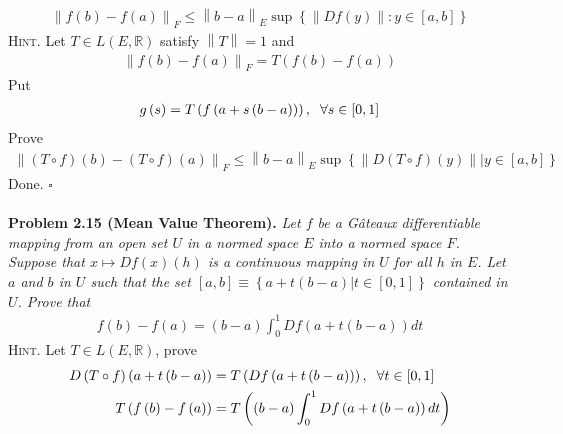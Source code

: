 \documentclass[a4paper]{article}
\numberwithin{equation}{section}
\begin{document}
\begin{align}
{\left\| {f\left( b \right) - f\left( a \right)} \right\|_F} \le {\left\| {b - a} \right\|_E}\sup \left\{ {\left\| {Df\left( y \right)} \right\|:y \in \left[ {a,b} \right]} \right\}
\end{align} 
\textsc{Hint.} Let $T \in L\left( {E,\mathbb{R}} \right)$ satisfy $\left\| T \right\| = 1$ and
\begin{align}
{\left\| {f\left( b \right) - f\left( a \right)} \right\|_F} = T\left( {f\left( b \right) - f\left( a \right)} \right)
\end{align}
Put 
\begin{align}
g\left( s \right) = T\left( {f\left( {a + s\left( {b - a} \right)} \right)} \right),\hspace{0.2cm}\forall s \in \left[ {0,1} \right]
\end{align}
Prove
\begin{align}
{\left\| {\left( {T \circ f} \right)\left( b \right) - \left( {T \circ f} \right)\left( a \right)} \right\|_F} \le {\left\| {b - a} \right\|_E}\sup \left\{ {\left\| {D\left( {T \circ f} \right)\left( y \right)} \right\||y \in \left[ {a,b} \right]} \right\}
\end{align}
Done. \hfill $\square$\\
\\
\textbf{Problem 2.15 (Mean Value Theorem).} \textit{Let $f$ be a G\^{a}teaux differentiable mapping from an open set $U$ in a normed space $E$ into a normed space $F$. Suppose that $x \mapsto Df\left( x \right)\left( h \right)$ is a continuous mapping in $U$ for all $h$ in $E$. Let $a$ and $b$ in $U$ such that the set $\left[ {a,b} \right] \equiv \left\{ {a + t\left( {b - a} \right)|t \in \left[ {0,1} \right]} \right\}$ contained in $U$. Prove that}
\begin{align}
f\left( b \right) - f\left( a \right) = \left( {b - a} \right)\int_0^1 {Df\left( {a + t\left( {b - a} \right)} \right)dt} 
\end{align}
\textsc{Hint.} Let $T \in L\left( {E,\mathbb{R}} \right)$, prove 
\begin{align}
D\left( {T \circ f} \right)\left( {a + t\left( {b - a} \right)} \right) &= T\left( {Df\left( {a + t\left( {b - a} \right)} \right)} \right),\hspace{0.2cm}\forall t \in \left[ {0,1} \right]\\
T\left( {f\left( b \right) - f\left( a \right)} \right) &= T\left( {\left( {b - a} \right)\int_0^1 {Df\left( {a + t\left( {b - a} \right)} \right)dt} } \right)
\end{align}
\end{document}
